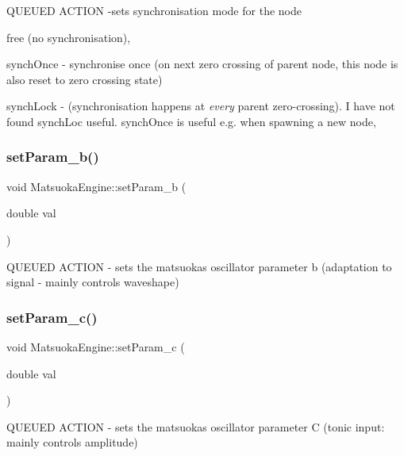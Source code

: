 Q\+U\+E\+U\+ED A\+C\+T\+I\+ON -\/sets synchronisation mode for the node
\begin{DoxyItemize}
\item free (no synchronisation),
\item synch\+Once -\/ synchronise once (on next zero crossing of parent node, this node is also reset to zero crossing state)
\item synch\+Lock -\/ (synchronisation happens at {\itshape every} parent zero-\/crossing). I have not found synch\+Loc useful. synch\+Once is useful e.\+g. when spawning a new node, 
\end{DoxyItemize}\mbox{\label{classMatsuokaEngine_aa568d548269415a9104a74eaec19d958}} 
\subsubsection{\texorpdfstring{set\+Param\+\_\+b()}{setParam\_b()}}
{\footnotesize\ttfamily void Matsuoka\+Engine\+::set\+Param\+\_\+b (\begin{DoxyParamCaption}\item[{double}]{val }\end{DoxyParamCaption})}



Q\+U\+E\+U\+ED A\+C\+T\+I\+ON -\/ sets the matsuoka\textquotesingle{}s oscillator parameter b (adaptation to signal -\/ mainly controls waveshape) 

\mbox{\label{classMatsuokaEngine_ad210d56ae83d896c39e72d93a6263035}} 
\subsubsection{\texorpdfstring{set\+Param\+\_\+c()}{setParam\_c()}}
{\footnotesize\ttfamily void Matsuoka\+Engine\+::set\+Param\+\_\+c (\begin{DoxyParamCaption}\item[{double}]{val }\end{DoxyParamCaption})}



Q\+U\+E\+U\+ED A\+C\+T\+I\+ON -\/ sets the matsuoka\textquotesingle{}s oscillator parameter C (tonic input\+: mainly controls amplitude) 

